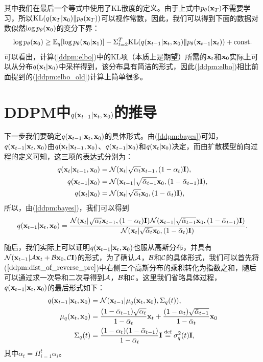 \documentclass[11pt,a4paper,UTF8]{ctexart}
\begin{document}
\begin{appendices}
其中我们在最后一个等式中使用了KL散度的定义。由于上式中$p_{\theta}(\mathbf{x}_T)$不需要学习，所以$\text{KL}(q(\mathbf{x}_T|\mathbf{x}_0)\| p_{\theta}(\mathbf{x}_T))$可以视作常数，因此，我们可以得到下面的数据对数似然$\log p_{\theta}(\mathbf{x}_0)$的变分下界：
\begin{equation}
\log p_{\theta}(\mathbf{x}_0) \geq \mathbb{E}_q [\log p_{\theta}(\mathbf{x}_0|\mathbf{x}_1)] -  \Sigma_{t=2}^T \text{KL}(q(\mathbf{x}_{t-1}|\mathbf{x}_t,\mathbf{x}_0) \| p_{\theta}(\mathbf{x}_{t-1}|\mathbf{x}_t)) + \text{const}.
\label{ddpm:elbo}
\end{equation}
可以看出，计算(\ref{ddpm:elbo})中的KL项（本质上是期望）所需的$\mathbf{x}_t$和$\mathbf{x}_0$实际上可以从分布$q(\mathbf{x}_t|\mathbf{x}_0)$中采样得到，该分布具有简洁的形式，因此(\ref{ddpm:elbo})相比前面提到的(\ref{ddpm:elbo_old})计算上简单很多。

\section{DDPM中$q(\mathbf{x}_{t-1}|\mathbf{x}_t,\mathbf{x}_0)$的推导}
\label{app:ddpm_forward_posterior_distribution}

下一步我们要确定$q(\mathbf{x}_{t-1}|\mathbf{x}_t,\mathbf{x}_0)$的具体形式。由(\ref{ddpm:bayes})可知，$q(\mathbf{x}_{t-1}|\mathbf{x}_t,\mathbf{x}_0)$由$q(\mathbf{x}_{t}|\mathbf{x}_{t-1},\mathbf{x}_0)$、$q(\mathbf{x}_{t-1}|\mathbf{x}_0)$和$q(\mathbf{x}_{t}|\mathbf{x}_0)$决定，而由扩散模型前向过程的定义可知，这三项的表达式分别为：
\begin{align*}
    q(\mathbf{x}_{t}|\mathbf{x}_{t-1},\mathbf{x}_0) &= \mathcal{N}(\mathbf{x}_t|\sqrt{\alpha_t}\mathbf{x}_{t-1},(1-\alpha_t)\mathbf{I}),  \\
    q(\mathbf{x}_{t-1}|\mathbf{x}_0) &= \mathcal{N}(\mathbf{x}_{t-1}|\sqrt{\bar{\alpha}_{t-1}}\mathbf{x}_0,(1-\bar{\alpha}_{t-1})\mathbf{I}), \\
    q(\mathbf{x}_{t}|\mathbf{x}_0) &=\mathcal{N}(\mathbf{x}_{t}|\sqrt{\bar{\alpha}_{t}}\mathbf{x}_0,(1-\bar{\alpha}_{t})\mathbf{I}),
\end{align*}
所以，由(\ref{ddpm:bayes})，我们可以得到
\begin{equation}
    q(\mathbf{x}_{t-1}|\mathbf{x}_t,\mathbf{x}_0) = \frac{\mathcal{N}(\mathbf{x}_t|\sqrt{\alpha_t}\mathbf{x}_{t-1},(1-\alpha_t)\mathbf{I})\mathcal{N}(\mathbf{x}_{t-1}|\sqrt{\bar{\alpha}_{t-1}}\mathbf{x}_0,(1-\bar{\alpha}_{t-1})\mathbf{I})}{\mathcal{N}(\mathbf{x}_{t}|\sqrt{\bar{\alpha}_{t}}\mathbf{x}_0,(1-\bar{\alpha}_{t})\mathbf{I})}.
\label{ddpm:dist_of_reverse_pre}
\end{equation}

随后，我们实际上可以证明$q(\mathbf{x}_{t-1}|\mathbf{x}_t,\mathbf{x}_0)$也服从高斯分布，并具有$\mathcal{N}(\mathbf{x}_{t-1}|\mathcal{A}\mathbf{x}_t+\mathcal{B}\mathbf{x}_0,\mathcal{C}\mathbf{I})$的形式，为了确认$\mathcal{A}$，$\mathcal{B}$和$\mathcal{C}$的具体形式，我们可以首先将($\ref{ddpm:dist_of_reverse_pre}$)中右侧三个高斯分布的乘积转化为指数之和，随后可以通过求一次导和二次导得到$\mathcal{A}$，$\mathcal{B}$和$\mathcal{C}$。这里我们省略具体过程，$q(\mathbf{x}_{t-1}|\mathbf{x}_t,\mathbf{x}_0)$的最后形式如下：
\begin{align}
\begin{split}
    q(\mathbf{x}_{t-1}|\mathbf{x}_t,\mathbf{x}_0) &= \mathcal{N}(\mathbf{x}_{t-1}|\mu_q(\mathbf{x}_t,\mathbf{x}_0),\Sigma_q(t)),\\
    \mu_q(\mathbf{x}_t,\mathbf{x}_0) &= \frac{(1-\bar{\alpha}_{t-1})\sqrt{\alpha_t}}{1-\bar{\alpha}_t}\mathbf{x}_t + \frac{(1-\alpha_t)\sqrt{\bar{\alpha}_{t-1}}}{1-\bar{\alpha}_t}\mathbf{x}_0 \\
    \Sigma_q(t) &= \frac{(1-\alpha_t)(1-\bar{\alpha}_{t-1})}{1-\bar{\alpha}_t}\mathbf{I}  \stackrel{\text{def}}{=} \sigma_q^2(t)\mathbf{I},
\end{split}
\label{ddpm:dist_of_reverse}
\end{align}
其中$\bar{\alpha}_t=\Pi_{i=1}^t \alpha_i$。


\end{appendices}
\end{document}
